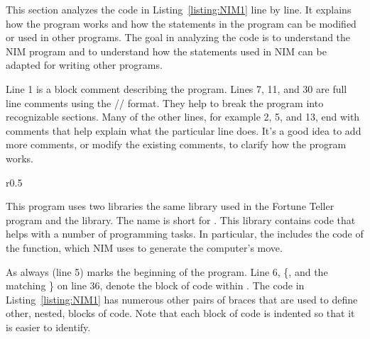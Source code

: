 This section analyzes the code in Listing~\ref{listing:NIM1} line by line.  It explains how the program works and how the statements in the program can be modified or used in other programs.  The goal in analyzing the code is to understand the NIM program and to understand how the statements used in NIM can be adapted for writing other programs.

Line 1 is a block comment describing the program.  
Lines 7, 11, and 30 are full line comments using the // format.  They help to break the program into recognizable sections.
Many of the other lines, for example 2, 5, and 13, end with comments that help explain what the particular line does.  It's a good idea to add more comments, or modify the existing comments, to clarify how the program works.


\begin{wrapfigure}{r}{0.5\textwidth} \vspace{-0.3cm} 
\vspace{-0.5cm} \end{wrapfigure}

This program uses two libraries the same  library used in the Fortune Teller program and  the  library.  The name  is short for   .  This library contains code that helps with a number of programming tasks.  In particular, the  includes the code of the  function, which NIM  uses  to generate the computer's move.


As always  (line 5) marks the beginning of the program. 
Line 6, \{, and the matching \} on line 36, denote the block of code within .  The code in Listing~\ref{listing:NIM1}  has numerous other pairs of braces that are used to define other, nested, blocks of code. Note that each block of code is indented so that it is easier to identify.   

